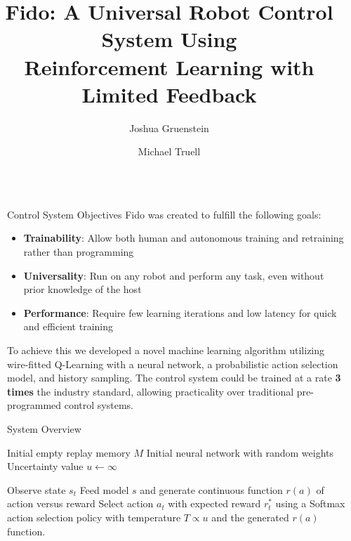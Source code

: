 \documentclass[final]{beamer}
\title{Fido: A Universal Robot Control System Using\\Reinforcement Learning with Limited Feedback}
\author{\LARGE Joshua Gruenstein \and Michael Truell}
\institute{\mbox{}}
\newlength{\sepwid}
\newlength{\onecolwid}
\begin{document}
\setlength{\belowcaptionskip}{2ex}
\setlength\belowdisplayshortskip{2ex}

\begin{frame}[t]
\begin{columns}[t]

\begin{column}{\sepwid}\end{column}
\begin{column}{\onecolwid}

	\begin{alertblock}{Control System Objectives}
		Fido was created to fulfill the following goals:
		\begin{itemize}
			\item \textbf{Trainability}: Allow both human and autonomous training and retraining rather than programming
			\item \textbf{Universality}: Run on any robot and perform any task, even without prior knowledge of the host
			\item \textbf{Performance}: Require few learning iterations and low latency for quick and efficient training
		\end{itemize}
		To achieve this we developed a novel machine learning algorithm utilizing wire-fitted Q-Learning with a neural network, a probabilistic action selection model, and history sampling.  The control system could be trained at a rate \textbf{3 times} the industry standard, allowing practicality over traditional pre-programmed control systems.
	\end{alertblock}

	\begin{block}{System Overview}
		\begin{algorithm}[H]
		\caption*{\textbf{Fido Control System Algorithm}}\label{euclid}
		\small
		\begin{algorithmic}[1]
			\State Initial empty replay memory $M$
			\State Initial neural network with random weights
			\State Uncertainty value $u \gets \infty$

			  \State Observe state $s_t$
			  \State Feed model $s$ and generate continuous function $r(a)$ of action versus reward
			  \State Select action $a_t$ with expected reward $r_t^*$ using a Softmax action selection policy with temperature $T \propto u$ and the generated $r(a)$ function.


\end{algorithmic}
\end{algorithm}
\end{block}
\end{column}
\end{columns}
\end{frame}
\end{document}
